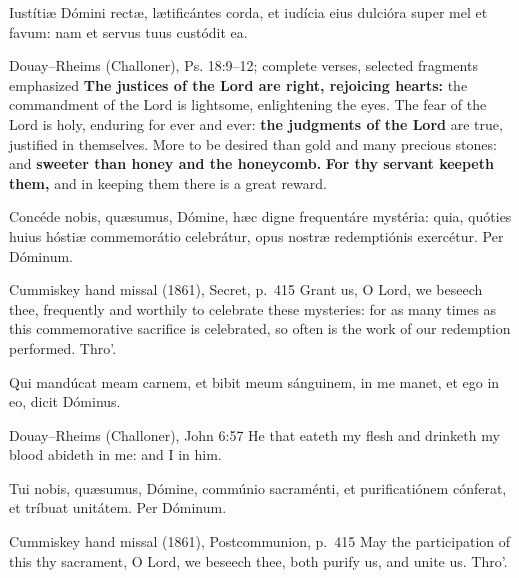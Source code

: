 Iustítiæ Dómini rectæ, lætificántes corda, et iudícia eius dulcióra super mel
et favum: nam et servus tuus custódit ea.
\finishfulltextelement
\begin{fulltextenglish}{Douay--Rheims (Challoner), Ps. 18:9--12; complete verses, selected fragments emphasized}
\textbf{The justices of the Lord are right, rejoicing hearts:} the commandment
of the Lord is lightsome, enlightening the eyes. The fear of the Lord is
holy, enduring for ever and ever: \textbf{the judgments of the Lord} are true,
justified in themselves. More to be desired than gold and many precious
stones: and \textbf{sweeter than honey and the honeycomb.} \textbf{For thy
servant keepeth them,} and in keeping them there is a great reward.
\end{fulltextenglish}

Concéde nobis, quæsumus, Dómine, hæc digne frequentáre mystéria: quia,
quóties huius hóstiæ commemorátio celebrátur, opus nostræ redemptiónis
exercétur. Per Dóminum.
\finishfulltextelement
\begin{fulltextenglish}{Cummiskey hand missal (1861), Secret, p.~415}
Grant us, O Lord, we beseech thee, frequently and worthily to celebrate these
mysteries: for as many times as this commemorative sacrifice is celebrated,
so often is the work of our redemption performed. Thro'.
\end{fulltextenglish}

Qui mandúcat meam carnem, et bibit meum sánguinem, in me manet, et ego in eo,
dicit Dóminus.
\finishfulltextelement
\begin{fulltextenglish}{Douay--Rheims (Challoner), John 6:57}
He that eateth my flesh and drinketh my blood abideth in me: and I in him.
\end{fulltextenglish}

Tui nobis, quæsumus, Dómine, commúnio sacraménti, et purificatiónem cónferat,
et tríbuat unitátem. Per Dóminum.
\finishfulltextelement
\begin{fulltextenglish}{Cummiskey hand missal (1861), Postcommunion, p.~415}
May the participation of this thy sacrament, O Lord, we beseech thee, both
purify us, and unite us. Thro'.
\end{fulltextenglish}
\endgroup
